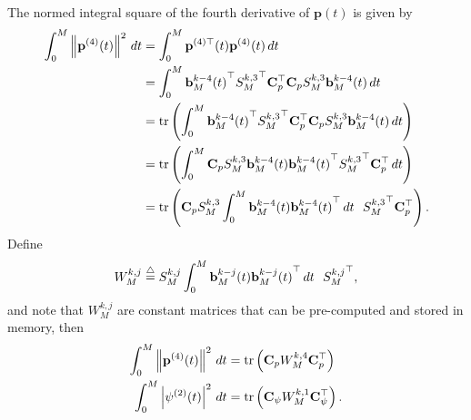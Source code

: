 The normed integral square of the fourth derivative of $\mathbf{p}(t)$ is given by
\begin{align*}
	\int_0^M \left\|\mathbf{p}^{(4)}(t)\right\|^2 \, dt
		&= 	\int_0^M \mathbf{p}^{(4)\top}(t)\mathbf{p}^{(4)}(t) \, dt \\
		&= 	\int_0^M 	{\mathbf{b}_M^{k-4}(t)}^\top {S_M^{k,3}}^\top 
				\mathbf{C}_p^\top \mathbf{C}_p S_M^{k,3} 	\mathbf{b}_M^{k-4}(t) \, dt \\
		&= 	\text{tr}\left(\int_0^M 	{\mathbf{b}_M^{k-4}(t)}^\top {S_M^{k,3}}^\top 
				\mathbf{C}_p^\top \mathbf{C}_p S_M^{k,3} 	\mathbf{b}_M^{k-4}(t) \, dt \right) \\
		&= 	\text{tr}\left(\int_0^M 	\mathbf{C}_p S_M^{k,3} 	\mathbf{b}_M^{k-4}(t) {\mathbf{b}_M^{k-4}(t)}^\top {S_M^{k,3}}^\top 
				\mathbf{C}_p^\top  \, dt \right) \\
		&= 	\text{tr}\left( \mathbf{C}_p S_M^{k,3} \int_0^M 	\mathbf{b}_M^{k-4}(t) {\mathbf{b}_M^{k-4}(t)}^\top \, dt~~ {S_M^{k,3}}^\top 
				\mathbf{C}_p^\top \right).
\end{align*}
Define
\[
W_M^{k,j} \stackrel{\triangle}{=} S_M^{k,j} \int_0^M 	\mathbf{b}_M^{k-j}(t) {\mathbf{b}_M^{k-j}(t)}^\top \, dt~~ {S_M^{k,j}}^\top,
\]
and note that $W_M^{k,j}$ are constant matrices that can be pre-computed and stored in memory,
then 
\begin{align*}
\int_0^M \left\|\mathbf{p}^{(4)}(t)\right\|^2 \, dt &= \text{tr}\left(\mathbf{C}_p W_M^{k,4} \mathbf{C}_p^\top \right) \\
\int_0^M \left|\psi^{(2)}(t)\right|^2 \, dt &= \text{tr}\left(\mathbf{C}_\psi W_M^{k,1} \mathbf{C}_\psi^\top \right).
\end{align*}

